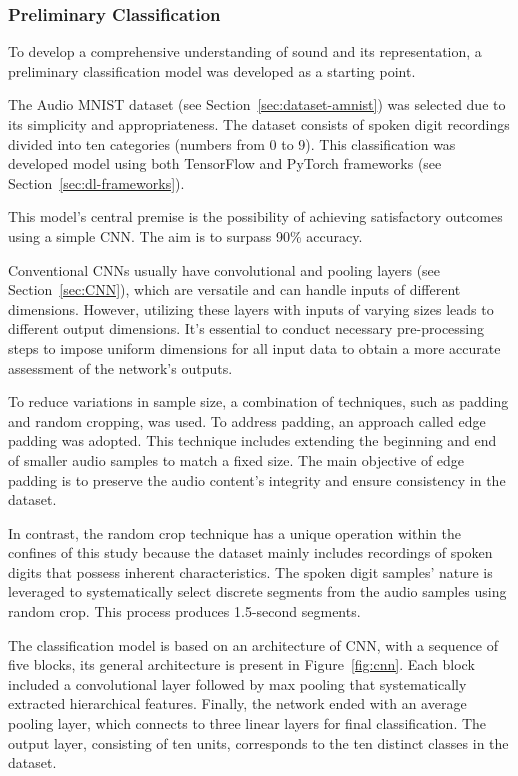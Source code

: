 \subsubsection{Preliminary Classification} \label{sec:classification-model}

To develop a comprehensive understanding of sound and its representation, a preliminary classification model was developed as a starting point.

The Audio MNIST dataset (see Section~\ref{sec:dataset-amnist}) was selected due to its simplicity and appropriateness. The dataset consists of spoken digit recordings divided into ten categories (numbers from 0 to 9). This classification was developed model using both TensorFlow and PyTorch frameworks (see Section~\ref{sec:dl-frameworks}).

This model's central premise is the possibility of achieving satisfactory outcomes using a simple \ac{CNN}. The aim is to surpass 90\% accuracy.

Conventional \acp{CNN} usually have convolutional and pooling layers (see Section~\ref{sec:CNN}), which are versatile and can handle inputs of different dimensions. However, utilizing these layers with inputs of varying sizes leads to different output dimensions. It's essential to conduct necessary pre-processing steps to impose uniform dimensions for all input data to obtain a more accurate assessment of the network's outputs.

To reduce variations in sample size, a combination of techniques, such as padding and random cropping, was used. To address padding, an approach called edge padding was adopted. This technique includes extending the beginning and end of smaller audio samples to match a fixed size. The main objective of edge padding is to preserve the audio content's integrity and ensure consistency in the dataset.

In contrast, the random crop technique has a unique operation within the confines of this study because the dataset mainly includes recordings of spoken digits that possess inherent characteristics. The spoken digit samples' nature is leveraged to systematically select discrete segments from the audio samples using random crop. This process produces 1.5-second segments.

The classification model is based on an architecture of \ac{CNN}, with a sequence of five blocks, its general architecture is present in Figure~\ref{fig:cnn}. Each block included a convolutional layer followed by max pooling that systematically extracted hierarchical features. Finally, the network ended with an average pooling layer, which connects to three linear layers for final classification. The output layer, consisting of ten units, corresponds to the ten distinct classes in the dataset.

